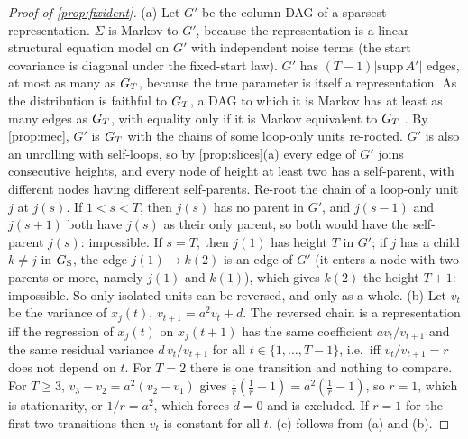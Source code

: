 \begin{proof}[Proof of \cref{prop:fixident}]
(a) Let $G'$ be the column DAG of a sparsest representation. $\Sigma$ is
Markov to $G'$, because the representation is a linear structural equation
model on $G'$ with independent noise terms (the start covariance is diagonal
under the fixed-start law). $G'$ has $(T-1)|\mathrm{supp}\,A'|$ edges, at most
as many as $G_T$, because the true parameter is itself a representation. As
the distribution is faithful to $G_T$, a DAG to which it is Markov has at
least as many edges as $G_T$, with equality only if it is Markov equivalent
to $G_T$ \citep[Theorem~4]{chickering2002optimal}. By \cref{prop:mec}, $G'$ is
$G_T$ with the chains of some loop-only units re-rooted. $G'$ is also an
unrolling with self-loops, so by \cref{prop:slices}(a) every edge of $G'$
joins consecutive heights, and every node of height at least two has a
self-parent, with different nodes having different self-parents. Re-root the
chain of a loop-only unit $j$ at $j(s)$. If $1<s<T$, then $j(s)$ has no parent
in $G'$, and $j(s{-}1)$ and $j(s{+}1)$ both have $j(s)$ as their only parent,
so both would have the self-parent $j(s)$: impossible. If $s=T$, then $j(1)$
has height $T$ in $G'$; if $j$ has a child $k\ne j$ in $G_{\mathrm S}$, the edge
$j(1)\to k(2)$ is an edge of $G'$ (it enters a node with two parents or more,
namely $j(1)$ and $k(1)$), which gives $k(2)$ the height $T+1$: impossible. So
only isolated units can be reversed, and only as a whole.
(b) Let $v_t$ be the variance of $x_j(t)$, $v_{t+1}=a^2v_t+d$. The reversed
chain is a representation iff the regression of $x_j(t)$ on $x_j(t{+}1)$ has
the same coefficient $a v_t/v_{t+1}$ and the same residual variance
$d\,v_t/v_{t+1}$ for all $t\in\{1,\dots,T-1\}$, i.e.\ iff $v_t/v_{t+1}=r$ does
not depend on $t$. For $T=2$ there is one transition and nothing to compare.
For $T\ge3$, $v_3-v_2=a^2(v_2-v_1)$ gives
$\tfrac1r(\tfrac1r-1)=a^2(\tfrac1r-1)$, so $r=1$, which is stationarity, or
$1/r=a^2$, which forces $d=0$ and is excluded. If $r=1$ for the first two
transitions then $v_t$ is constant for all $t$.
(c) follows from (a) and (b).
\end{proof}

